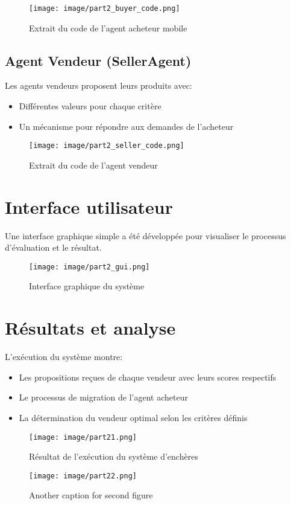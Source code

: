\documentclass[a4paper,12pt]{report}
\begin{document}
\begin{figure}[H]
    \centering
    \texttt{[image: image/part2\_buyer\_code.png]}
    \caption{Extrait du code de l'agent acheteur mobile}
\end{figure}

\subsection{Agent Vendeur (SellerAgent)}
Les agents vendeurs proposent leurs produits avec:
\begin{itemize}
    \item Différentes valeurs pour chaque critère
    \item Un mécanisme pour répondre aux demandes de l'acheteur
\end{itemize}

\begin{figure}[H]
    \centering
    \texttt{[image: image/part2\_seller\_code.png]}
    \caption{Extrait du code de l'agent vendeur}
\end{figure}

\section{Interface utilisateur}
Une interface graphique simple a été développée pour visualiser le processus d'évaluation et le résultat.

\begin{figure}[H]
    \centering
    \texttt{[image: image/part2\_gui.png]}
    \caption{Interface graphique du système}
\end{figure}

\section{Résultats et analyse}
L'exécution du système montre:
\begin{itemize}
    \item Les propositions reçues de chaque vendeur avec leurs scores respectifs
    \item Le processus de migration de l'agent acheteur
    \item La détermination du vendeur optimal selon les critères définis
\end{itemize}

\begin{figure}[H]
    \centering
    \begin{minipage}{0.48\textwidth}
        \centering
        \texttt{[image: image/part21.png]}
        \caption{Résultat de l'exécution du système d'enchères}
        \label{fig:part1_execution}
    \end{minipage}
    \hfill
    \begin{minipage}{0.38\textwidth}
        \centering
        \texttt{[image: image/part22.png]}
        \caption{Another caption for second figure}
        \label{fig:second_figure}
    \end{minipage}
\end{figure}
\end{document}
